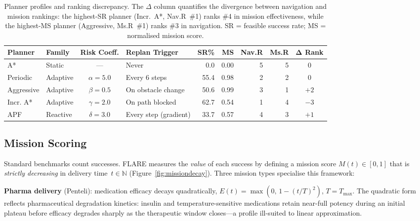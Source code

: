 \documentclass[drones,article,submit,moreauthors]{Definitions/mdpi}
\begin{document}
\begin{table}[!htb]
\centering
\caption{Planner profiles and ranking discrepancy. The $\Delta$ column
  quantifies the divergence between navigation and mission rankings:
  the highest-SR planner (Incr.\ A*, Nav.R~\#1) ranks \#4 in mission
  effectiveness, while the highest-MS planner (Aggressive, Ms.R~\#1)
  ranks \#3 in navigation.
  SR = feasible success rate; MS = normalised mission score.}
\label{tab:planner_profiles}
\begin{tabular}{llclrrrrc}
\toprule
\textbf{Planner} & \textbf{Family} & \textbf{Risk Coeff.} & \textbf{Replan Trigger} & \textbf{SR\%} & \textbf{MS} & \textbf{Nav.R} & \textbf{Ms.R} & $\boldsymbol{\Delta}$ \textbf{Rank} \\
\midrule
A* & Static & --- & Never & 0.0 & 0.00 & 5 & 5 & $0$ \\
Periodic & Adaptive & $\alpha{=}5.0$ & Every 6 steps & 55.4 & 0.98 & 2 & 2 & $0$ \\
Aggressive & Adaptive & $\beta{=}0.5$ & On obstacle change & 50.6 & 0.99 & 3 & 1 & $+2$ \\
Incr. A* & Adaptive & $\gamma{=}2.0$ & On path blocked & 62.7 & 0.54 & 1 & 4 & $-3$ \\
APF & Reactive & $\delta{=}3.0$ & Every step (gradient) & 33.7 & 0.57 & 4 & 3 & $+1$ \\
\bottomrule
\end{tabular}
\end{table}

\subsection{Mission Scoring}\label{sec:missions}

Standard benchmarks count successes. FLARE measures the \emph{value} of
each success by defining a mission score $M(t) \in [0,1]$ that is
\emph{strictly decreasing} in delivery time~$t \in \mathbb{N}$
(Figure~\ref{fig:missiondecay}). Three mission types specialise this
framework:

\textbf{Pharma delivery} (Penteli): medication efficacy decays
quadratically, $E(t) = \max(0,\, 1 - (t/T)^2)$, $T{=}T_{\max}$.
The quadratic form reflects pharmaceutical degradation kinetics:
insulin and temperature-sensitive medications retain near-full
potency during an initial plateau before efficacy degrades
sharply as the therapeutic window closes---a profile ill-suited
to linear approximation.
\end{document}
